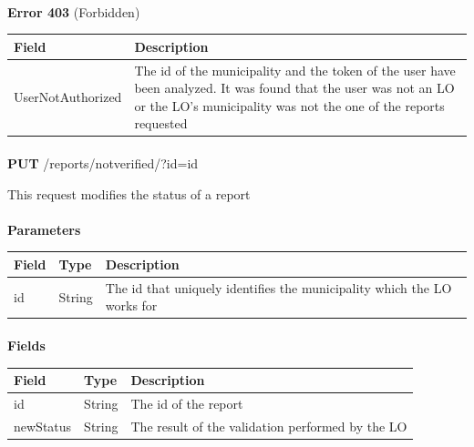 						\paragraph{}
							\textbf{Error 403} (Forbidden)
							\begin{table}[!h]
								\begin{tabular}{L{0.4\textwidth}L{0.4\textwidth}}
									\toprule
									Field & Description \\
									\midrule
								  	UserNotAuthorized & The id of the municipality and the token of the user have been analyzed. It was found that the user was not an LO or the LO's municipality was not the one of the reports requested \\
								 	\bottomrule
								\end{tabular}
							\end{table}
							
							\paragraph{}
						\textbf{PUT} /reports/notverified/?id={id}
						
						This request modifies the status of a report
						\paragraph{}
							\textbf{Parameters}
							\begin{table}[!h]
								\begin{tabular}{L{0.2\textwidth}L{0.2\textwidth}L{0.4\textwidth}}
									\toprule
									Field & Type & Description \\
									\midrule
								 	id & String & The id that uniquely identifies the municipality which the LO works for \\
								 	\bottomrule
								\end{tabular}
							\end{table}
						\paragraph{}
							\textbf{Fields}
							\begin{table}[!h]
								\begin{tabular}{L{0.25\textwidth}L{0.15\textwidth}L{0.4\textwidth}}
									\toprule
									Field & Type & Description \\
									\midrule
								 	id & String & The id of the report \\
								 	newStatus & String & The result of the validation performed by the LO \\
								 	\bottomrule
								\end{tabular}
							\end{table}
